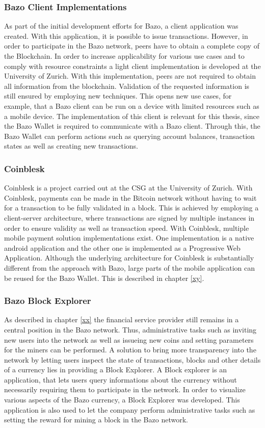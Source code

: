 \documentclass[a4paper]{article}
\begin{document}
\subsubsection{Bazo Client Implementations}
As part of the initial development efforts for Bazo, a client application was created. With this application, it is possible to issue transactions. However, in order to participate in the Bazo network, peers have to obtain a complete copy of the Blockchain. In order to increase applicability for various use cases and to comply with resource constraints a light client implementation is developed at the University of Zurich. With this implementation, peers are not required to obtain all information from the blockchain. Validation of the requested information is still ensured by employing new techniques. This opens new use cases, for example, that a Bazo client can be run on a device with limited resources such as a mobile device.
The implementation of this client is relevant for this thesis, since the Bazo Wallet is required to communicate with a Bazo client. Through this, the Bazo Wallet can perform actions such as querying account balances, transaction states as well as creating new transactions.
\subsubsection{Coinblesk}
Coinblesk is a project carried out at the CSG at the University of Zurich. With Coinblesk, payments can be made in the Bitcoin network without having to wait for a transaction to be fully validated in a block. This is achieved by employing a client-server architecture, where transactions are signed by multiple instances in order to ensure validity as well as transaction speed.
With Coinblesk, multiple mobile payment solution implementations exist. One implementation is a native android application and the other one is implemented as a Progressive Web Application. Although the underlying architecture for Coinblesk is substantially different from the approach with Bazo, large parts of the mobile application can be reused for the Bazo Wallet. This is described in chapter \ref{xy}.
\subsubsection{Bazo Block Explorer}
As described in chapter \ref{xx} the financial service provider still remains in a central position in the Bazo network. Thus, administrative tasks such as inviting new users into the network as well as issueing new coins and setting
parameters for the miners can be performed.
A solution to bring more transparency into the network by letting users inspect the state of transactions, blocks and other details of a currency lies in providing a Block Explorer. A Block explorer is an application, that lets users query informations about the currency without necessarily requiring them to participate in the network.
In order to visualize various aspects of the Bazo currency, a Block Explorer was developed. This application is also used to let the company perform administrative tasks such as setting the reward for mining a block in the Bazo network.
\newpage
\end{document}
